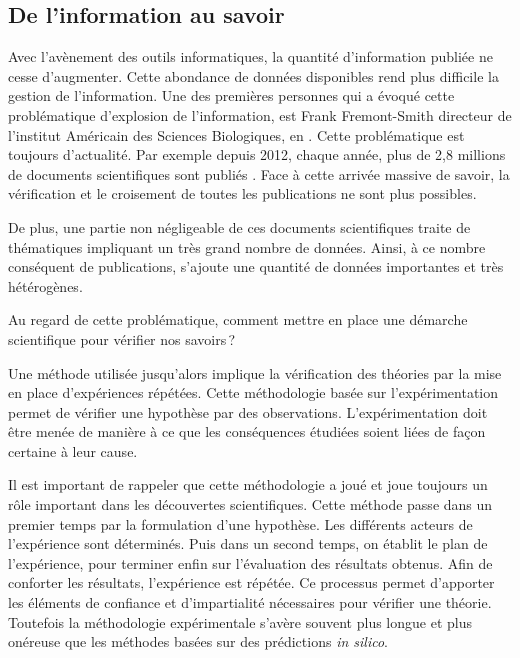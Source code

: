 \begin{refsegment}
\chapter*{De l'information au savoir}
Avec l'avènement des outils informatiques, la quantité d'information publiée ne cesse d'augmenter. Cette abondance de données disponibles rend plus difficile la gestion de l'information. Une des premières personnes qui a évoqué cette problématique d'explosion de l'information, est Frank Fremont-Smith directeur de l'institut Américain des Sciences Biologiques,  en \citeyear{fremont61}  \cite{fremont61}. Cette problématique est toujours d'actualité. Par exemple depuis 2012, chaque année, plus de 2,8 millions de documents scientifiques sont publiés  \cite{oecd2016} . Face à cette arrivée massive de savoir, la vérification et le croisement de toutes les publications ne sont plus possibles.

De plus, une partie non négligeable de ces documents scientifiques traite de thématiques impliquant un très grand nombre de données. Ainsi, à ce nombre conséquent de publications, s'ajoute une quantité de données importantes et très hétérogènes.

Au regard de cette problématique, comment mettre en place une démarche scientifique pour vérifier nos savoirs ?

Une méthode utilisée jusqu'alors implique la vérification des théories par la mise en place d'expériences répétées. Cette méthodologie basée sur l'expérimentation permet de vérifier une hypothèse par des observations. L'expérimentation doit être menée de manière à ce que les conséquences étudiées soient liées de façon certaine à leur cause.

Il est important de rappeler que cette méthodologie a joué et joue toujours un rôle important dans les découvertes scientifiques. Cette méthode passe dans un premier temps par la formulation d'une hypothèse. Les différents acteurs de l'expérience sont déterminés. Puis dans un second temps, on établit le plan de l'expérience, pour terminer enfin sur l'évaluation des résultats obtenus. Afin de conforter les résultats, l'expérience est répétée. Ce processus permet d'apporter les éléments de confiance et d'impartialité nécessaires pour vérifier une théorie. Toutefois la méthodologie expérimentale s'avère souvent plus longue et plus onéreuse que les méthodes basées sur des prédictions \textit{in silico}. 


\end{refsegment}
